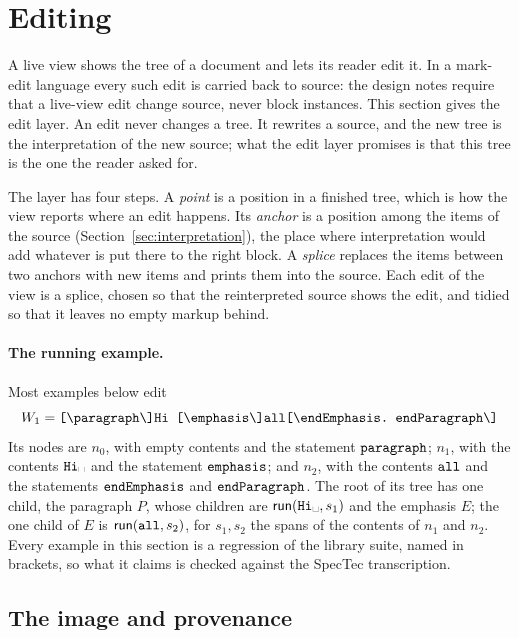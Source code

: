 \documentclass[11pt]{article}
\numberwithin{equation}{section}
\newcommand{\kw}[1]{\ensuremath{\mathsf{#1}}}
\newcommand{\str}[1]{\ensuremath{\text{\texttt{#1}}}}
\newcommand{\bs}{\textbackslash}
\newcommand{\vs}{\text{\textvisiblespace}}
\begin{document}
\section{Editing}
\label{sec:editing}

A live view shows the tree of a document and lets its reader edit it.  In a
mark-edit language every such edit is carried back to source: the design
notes require that a live-view edit change source, never block instances.
This section gives the edit layer.  An edit never changes a tree.  It
rewrites a source, and the new tree is the interpretation of the new
source; what the edit layer promises is that this tree is the one the
reader asked for.

The layer has four steps.  A \emph{point} is a position in a finished tree,
which is how the view reports where an edit happens.  Its \emph{anchor} is a
position among the items of the source (Section~\ref{sec:interpretation}),
the place where interpretation would add whatever is put there to the right
block.  A \emph{splice} replaces the items between two anchors with new
items and prints them into the source.  Each edit of the view is a splice,
chosen so that the reinterpreted source shows the edit, and tidied so that
it leaves no empty markup behind.

\paragraph{The running example.}  Most examples below edit
\[
W_1 = \str{[\bs{}paragraph\bs]Hi\ [\bs{}emphasis\bs]all[\bs{}endEmphasis.\
  endParagraph\bs]}
\]
Its nodes are $n_0$, with empty contents and the statement
$\str{paragraph}$; $n_1$, with the contents $\str{Hi}\vs$ and the statement
$\str{emphasis}$; and $n_2$, with the contents $\str{all}$ and the
statements $\str{endEmphasis}$ and $\str{endParagraph}$.  The root of its
tree has one child, the paragraph $P$, whose children are
$\kw{run}(\str{Hi}\vs, s_1)$ and the emphasis $E$; the one child of $E$ is
$\kw{run}(\str{all}, s_2)$, for $s_1, s_2$ the spans of the contents of
$n_1$ and $n_2$.  Every example in this section is a regression of the
library suite, named in brackets, so what it claims is checked against the
SpecTec transcription.

\subsection{The image and provenance}
\label{sec:image}
\end{document}
